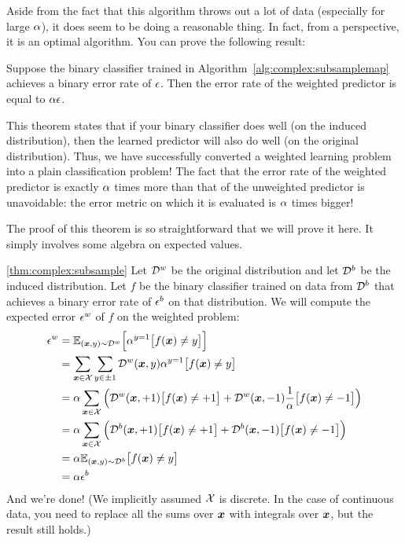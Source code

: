 Aside from the fact that this algorithm throws out a lot of data
(especially for large $\alpha$), it does seem to be doing a reasonable
thing.  In fact, from a  perspective, it is an
optimal algorithm.  You can prove the following result:

\begin{theorem} \label{thm:complex:subsample}
  Suppose the binary classifier trained in
  Algorithm~\ref{alg:complex:subsamplemap} achieves a binary error
  rate of $\epsilon$.  Then the error rate of the weighted predictor is
  equal to $\alpha\epsilon$.
\end{theorem}

This theorem states that if your binary classifier does well (on the
induced distribution), then the learned predictor will also do well
(on the original distribution).  Thus, we have successfully converted
a weighted learning problem into a plain classification problem!  The
fact that the error rate of the weighted predictor is exactly $\alpha$
times more than that of the unweighted predictor is unavoidable: the
error metric on which it is evaluated is $\alpha$ times bigger!


The proof of this theorem is so straightforward that we will prove it
here.  It simply involves some algebra on expected values.

\begin{myproof}{\ref{thm:complex:subsample}}
  Let $\mathcal{D}^w$ be the original distribution and let $\mathcal{D}^b$ be the
  induced distribution.  Let $f$ be the binary classifier trained on
  data from $\mathcal{D}^b$ that achieves a binary error rate of $\epsilon^b$ on
  that distribution.  We will compute the expected error $\epsilon^w$ of
  $f$ on the weighted problem:
  \begin{align}
    \epsilon^w 
    &= \mathbb{E}_{({\boldsymbol{x}},y) \sim \mathcal{D}^w} 
         \Big[ \alpha^{y=1} \big[f({\boldsymbol{x}}) \neq y\big] \Big] \\
    &= \sum_{{\boldsymbol{x}} \in \mathcal{X}} \sum_{y \in \pm 1}
         \mathcal{D}^w({\boldsymbol{x}},y) \alpha^{y=1} \big[f({\boldsymbol{x}}) \neq y\big] \\
    &= \alpha \sum_{{\boldsymbol{x}} \in \mathcal{X}} \Big(
         \mathcal{D}^w({\boldsymbol{x}},+1) \big[f({\boldsymbol{x}}) \neq +1\big] +
         \mathcal{D}^w({\boldsymbol{x}},-1) \frac 1 {\alpha} \big[f({\boldsymbol{x}}) \neq -1\big] \Big) \\
    &= \alpha \sum_{{\boldsymbol{x}} \in \mathcal{X}} \Big(
         \mathcal{D}^b({\boldsymbol{x}},+1) \big[f({\boldsymbol{x}}) \neq +1\big] +
         \mathcal{D}^b({\boldsymbol{x}},-1) \big[f({\boldsymbol{x}}) \neq -1\big] \Big) \\
    &= \alpha \mathbb{E}_{({\boldsymbol{x}},y) \sim \mathcal{D}^b} \big[f({\boldsymbol{x}}) \neq y\big] \\
    &= \alpha \epsilon^b
  \end{align}
And we're done!  (We implicitly assumed $\mathcal{X}$ is discrete.  In the
case of continuous data, you need to replace all the sums over ${\boldsymbol{x}}$
with integrals over ${\boldsymbol{x}}$, but the result still holds.)
\end{myproof}

